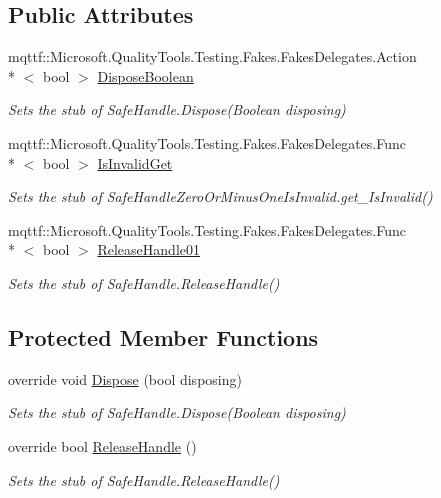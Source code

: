 \subsection*{Public Attributes}
\begin{DoxyCompactItemize}
\item 
mqttf\-::\-Microsoft.\-Quality\-Tools.\-Testing.\-Fakes.\-Fakes\-Delegates.\-Action\\*
$<$ bool $>$ \hyperlink{class_microsoft_1_1_win32_1_1_safe_handles_1_1_fakes_1_1_stub_safe_handle_zero_or_minus_one_is_invalid_a5911adcabfcd0bb4ddbef9018e0aadb5}{Dispose\-Boolean}
\begin{DoxyCompactList}\small\item\em Sets the stub of Safe\-Handle.\-Dispose(\-Boolean disposing)\end{DoxyCompactList}\item 
mqttf\-::\-Microsoft.\-Quality\-Tools.\-Testing.\-Fakes.\-Fakes\-Delegates.\-Func\\*
$<$ bool $>$ \hyperlink{class_microsoft_1_1_win32_1_1_safe_handles_1_1_fakes_1_1_stub_safe_handle_zero_or_minus_one_is_invalid_a727daf840cdce37da9899b2725d73f11}{Is\-Invalid\-Get}
\begin{DoxyCompactList}\small\item\em Sets the stub of Safe\-Handle\-Zero\-Or\-Minus\-One\-Is\-Invalid.\-get\-\_\-\-Is\-Invalid()\end{DoxyCompactList}\item 
mqttf\-::\-Microsoft.\-Quality\-Tools.\-Testing.\-Fakes.\-Fakes\-Delegates.\-Func\\*
$<$ bool $>$ \hyperlink{class_microsoft_1_1_win32_1_1_safe_handles_1_1_fakes_1_1_stub_safe_handle_zero_or_minus_one_is_invalid_a3b9ff59221a57760801a153b856da98f}{Release\-Handle01}
\begin{DoxyCompactList}\small\item\em Sets the stub of Safe\-Handle.\-Release\-Handle()\end{DoxyCompactList}\end{DoxyCompactItemize}
\subsection*{Protected Member Functions}
\begin{DoxyCompactItemize}
\item 
override void \hyperlink{class_microsoft_1_1_win32_1_1_safe_handles_1_1_fakes_1_1_stub_safe_handle_zero_or_minus_one_is_invalid_a2ef1ea832beaad4c59031d4cd2989100}{Dispose} (bool disposing)
\begin{DoxyCompactList}\small\item\em Sets the stub of Safe\-Handle.\-Dispose(\-Boolean disposing)\end{DoxyCompactList}\item 
override bool \hyperlink{class_microsoft_1_1_win32_1_1_safe_handles_1_1_fakes_1_1_stub_safe_handle_zero_or_minus_one_is_invalid_a02c8e3558352f24d69476cff948b8486}{Release\-Handle} ()
\begin{DoxyCompactList}\small\item\em Sets the stub of Safe\-Handle.\-Release\-Handle()\end{DoxyCompactList}\end{DoxyCompactItemize}
